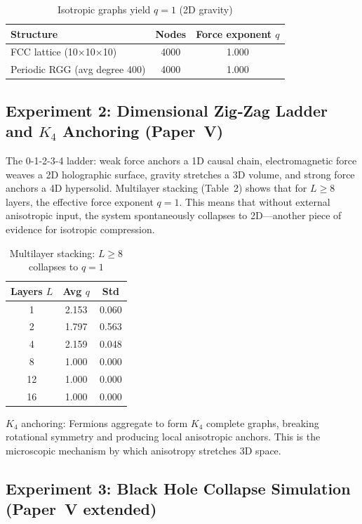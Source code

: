 \documentclass[12pt,a4paper]{article}
\begin{document}
\begin{table}[H]
\centering
\caption{Isotropic graphs yield $q=1$ (2D gravity)}
\begin{tabular}{lcc}
\toprule
Structure & Nodes & Force exponent $q$ \\
\midrule
FCC lattice (10×10×10) & 4000 & 1.000 \\
Periodic RGG (avg degree 400) & 4000 & 1.000 \\
\bottomrule
\end{tabular}
\end{table}

\subsection{Experiment 2: Dimensional Zig‑Zag Ladder and $K_4$ Anchoring (Paper~V)}

The 0-1-2-3-4 ladder: weak force anchors a 1D causal chain, electromagnetic force weaves a 2D holographic surface, gravity stretches a 3D volume, and strong force anchors a 4D hypersolid. Multilayer stacking (Table~2) shows that for $L\ge8$ layers, the effective force exponent $q=1$. This means that without external anisotropic input, the system spontaneously collapses to 2D—another piece of evidence for isotropic compression.

\begin{table}[H]
\centering
\caption{Multilayer stacking: $L\ge8$ collapses to $q=1$}
\begin{tabular}{ccc}
\toprule
Layers $L$ & Avg $q$ & Std \\
\midrule
1 & 2.153 & 0.060 \\
2 & 1.797 & 0.563 \\
4 & 2.159 & 0.048 \\
8 & 1.000 & 0.000 \\
12 & 1.000 & 0.000 \\
16 & 1.000 & 0.000 \\
\bottomrule
\end{tabular}
\end{table}

$K_4$ anchoring: Fermions aggregate to form $K_4$ complete graphs, breaking rotational symmetry and producing local anisotropic anchors. This is the microscopic mechanism by which anisotropy stretches 3D space.

\subsection{Experiment 3: Black Hole Collapse Simulation (Paper~V extended)}
\end{document}
